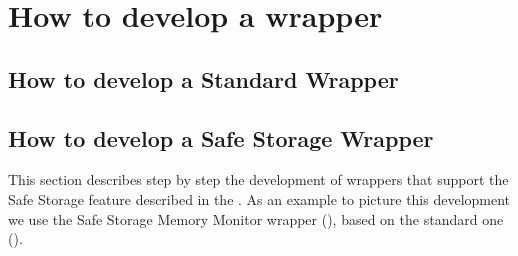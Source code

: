 \graphicspath{{chapters/ch-developer-guide/figures/}}

\section{How to develop a wrapper}

\subsection{How to develop a Standard Wrapper  \label{sec:developer-guide_wrappers}}

\subsection{How to develop a Safe Storage Wrapper}

This section describes step by step the development of wrappers that support the Safe Storage feature described in the .
As an example to picture this development we use the Safe Storage Memory Monitor wrapper (), based on the 
standard one ().

